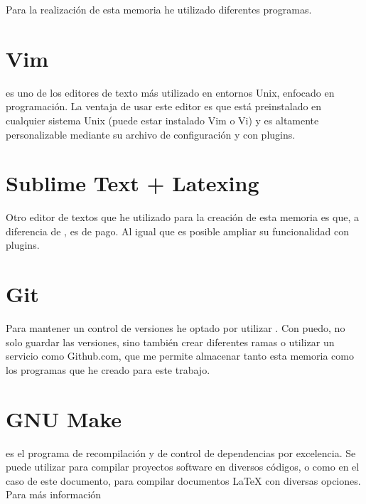 
Para la realización de esta memoria he utilizado diferentes programas.

\section*{Vim}
 es uno de los editores de texto más utilizado en entornos Unix, enfocado en programación. La ventaja de usar este editor es que está preinstalado en cualquier sistema Unix (puede estar instalado Vim o Vi) y es altamente personalizable mediante su archivo de configuración y con plugins.

\section*{Sublime Text + Latexing}
Otro editor de textos que he utilizado para la creación de esta memoria es  que, a diferencia de , es de pago. Al igual que  es posible ampliar su funcionalidad con plugins.

\section*{Git}
Para mantener un control de versiones he optado por utilizar . Con  puedo, no solo guardar las versiones, sino también crear diferentes ramas o utilizar un servicio como Github.com, que me permite almacenar tanto esta memoria como los programas que he creado para este trabajo.

\section*{GNU Make}

 es el programa de recompilación y de control de
dependencias por excelencia. Se puede utilizar para compilar proyectos
software en diversos códigos, o como en el caso de este documento,
para compilar documentos \LaTeX{} con diversas opciones.\\

Para más información \cite{pdf:make}
